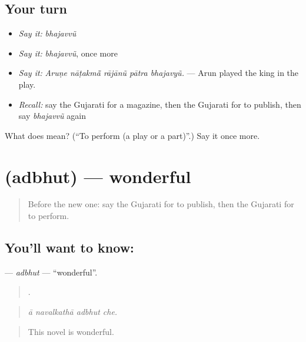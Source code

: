 \subsection*{Your turn}
\begin{itemize}
\raggedright
  \item \emph{Say it:} \emph{bhajavvũ}
  \item \emph{Say it:} \emph{bhajavvũ}, once more
  \item \emph{Say it:} \emph{Aruṇe nāṭakmā̃ rājānũ pātra bhajavyũ.} — Arun played the king in the play.
  \item \emph{Recall:} say the Gujarati for a magazine, then the Gujarati for to publish, then say \emph{bhajavvũ} again
\end{itemize}

\begin{tcolorbox}[breakable,colback=teal!4,colframe=teal!35!black,title={Before you move on}]
What does  mean? (\textquotedblleft{}To perform (a play or a part)\textquotedblright{}.) Say it once more.
\end{tcolorbox}
\section[\texorpdfstring{\gu{અદ્ભુત} (adbhut)}{અદ્ભુત (adbhut)}]{ (adbhut) — wonderful}

\label{lesson:GU-C338-adbhut}



\begin{quote}
Before the new one: say the Gujarati for to publish, then the Gujarati for to perform.
\end{quote}

\subsection*{You'll want to know: }
\textbf{} — \emph{adbhut} — \textquotedblleft{}wonderful\textquotedblright{}.

\begin{quote}
   .
\end{quote}

\begin{quote}
\emph{ā navalkathā adbhut che.}
\end{quote}

\begin{quote}
This novel is wonderful.
\end{quote}


